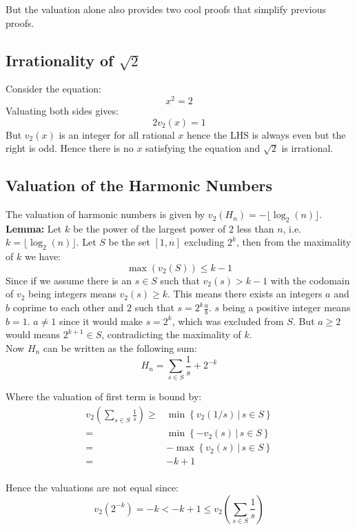 But the valuation alone also provides two cool proofs that simplify previous proofs.


\subsection{Irrationality of $\sqrt{2}$}
Consider the equation:
\[x^2 = 2\]
Valuating both sides gives:
\[2v_2(x) = 1\]
But $v_2(x)$ is an integer for all rational $x$ hence the LHS is always even but the right is odd.
Hence there is no $x$ satisfying the equation and $\sqrt{2}$ is irrational.

\subsection{Valuation of the Harmonic Numbers}
The valuation of harmonic numbers is given by $v_2(H_n) = -\lfloor \log_2(n) \rfloor$.
\\

{\textbf{Lemma:}}
Let $k$ be the power of the largest power of $2$ less than $n$, i.e. $k = \lfloor \log_2(n) \rfloor$.
Let $S$ be the set $[1,n]$ excluding $2^{k}$, then from the maximality of $k$ we have:
\[\max(v_2(S)) \leq k-1\]
Since if we assume there is an $s\in S$ such that $v_2(s) > k-1$ with the codomain of $v_2$ being integers means $v_2(s) \geq k$.
This means there exists an integers $a$ and $b$ coprime to each other and $2$ such that $s= 2^k\frac{a}{b}$.
$s$ being a positive integer means $b=1$. 
$a\neq1$ since it would make $s=2^k$, which was excluded from $S$.
But $a\geq2$ would means $2^{k+1} \in S$, contradicting the maximality of $k$.
\\

Now $H_n$ can be written as the following sum:
\[H_n = \sum_{s\in S} \frac{1}{s} + 2^{-k}\]

Where the valuation of  first term is bound by:
\begin{equation*}
\begin{aligned}
	v_2\left(\sum_{s\in S}\frac{1}{s}\right) \geq& \min\left\{v_2(1/s)\,|\,s\in S\right\} \\
	=& \min\left\{-v_2(s)\,|\,s\in S\right\} \\
	=& -\max\left\{v_2(s)\,|\,s\in S\right\} \\
	=& -k+1 \\
\end{aligned}
\end{equation*}

Hence the valuations are not equal since:
\[v_2(2^{-k}) = -k < -k+1 \leq v_2\left(\sum_{s\in S}\frac{1}{s}\right)\]

